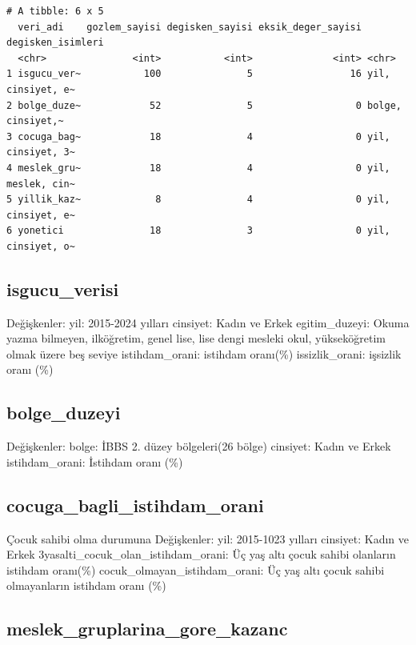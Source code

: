 \documentclass[
  11pt,
  a4paper,
  DIV=11,
  numbers=noendperiod]{scrartcl}
\begin{document}
\begin{verbatim}
# A tibble: 6 x 5
  veri_adi    gozlem_sayisi degisken_sayisi eksik_deger_sayisi degisken_isimleri
  <chr>               <int>           <int>              <int> <chr>            
1 isgucu_ver~           100               5                 16 yil, cinsiyet, e~
2 bolge_duze~            52               5                  0 bolge, cinsiyet,~
3 cocuga_bag~            18               4                  0 yil, cinsiyet, 3~
4 meslek_gru~            18               4                  0 yil, meslek, cin~
5 yillik_kaz~             8               4                  0 yil, cinsiyet, e~
6 yonetici               18               3                  0 yil, cinsiyet, o~
\end{verbatim}

\subsection{isgucu\_verisi}\label{isgucu_verisi}

Değişkenler: yil: 2015-2024 yılları cinsiyet: Kadın ve Erkek
egitim\_duzeyi: Okuma yazma bilmeyen, ilköğretim, genel lise, lise dengi
mesleki okul, yükseköğretim olmak üzere beş seviye istihdam\_orani:
istihdam oranı(\%) issizlik\_orani: işsizlik oranı (\%)

\subsection{bolge\_duzeyi}\label{bolge_duzeyi}

Değişkenler: bolge: İBBS 2. düzey bölgeleri(26 bölge) cinsiyet: Kadın ve
Erkek istihdam\_orani: İstihdam oranı (\%)

\subsection{cocuga\_bagli\_istihdam\_orani}\label{cocuga_bagli_istihdam_orani}

Çocuk sahibi olma durumuna Değişkenler: yil: 2015-1023 yılları cinsiyet:
Kadın ve Erkek 3yasalti\_cocuk\_olan\_istihdam\_orani: Üç yaş altı çocuk
sahibi olanların istihdam oranı(\%) cocuk\_olmayan\_istihdam\_orani: Üç
yaş altı çocuk sahibi olmayanların istihdam oranı (\%)

\subsection{meslek\_gruplarina\_gore\_kazanc}\label{meslek_gruplarina_gore_kazanc}
\end{document}
